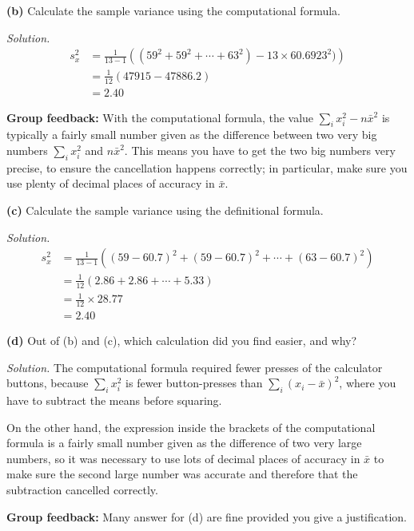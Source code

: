\documentclass[
  a4paper,
]{book}
\theoremstyle{definition}
\theoremstyle{definition}
\theoremstyle{definition}
\theoremstyle{definition}
\theoremstyle{remark}
\begin{document}
\textbf{(b)} Calculate the sample variance using the computational formula.

\begin{myanswers}
\emph{Solution.}
\begin{align*}
s_x^2 &= \frac{1}{13 - 1} \left( (59^2 + 59^2 + \cdots + 63^2) - 13 \times 60.6923^2)\right) \\
      &= \frac{1}{12} (47915 - 47886.2) \\
      &= 2.40
\end{align*}

\textbf{Group feedback:} With the computational formula, the value \(\sum_i x_i^2 - n \bar{x}^2\) is typically a fairly small number given as the difference between two very big numbers \(\sum_i x_i^2\) and \(n \bar x^2\). This means you have to get the two big numbers very precise, to ensure the cancellation happens correctly; in particular, make sure you use plenty of decimal places of accuracy in \(\bar x\).

\end{myanswers}

\textbf{(c)} Calculate the sample variance using the definitional
formula.

\begin{myanswers}
\emph{Solution.}
\begin{align*}
s_x^2 &= \frac{1}{13 - 1} \left( (59 - 60.7)^2 + (59 - 60.7)^2 + \cdots + (63 - 60.7)^2 \right) \\
      &= \frac{1}{12} (2.86 + 2.86 + \cdots + 5.33) \\
      &= \frac{1}{12} \times 28.77 \\
      &= 2.40
\end{align*}

\end{myanswers}

\textbf{(d)} Out of (b) and (c), which calculation did you find easier, and why?

\begin{myanswers}
\emph{Solution.} The computational formula required fewer presses of the calculator buttons, because \(\sum_i x_i^2\) is fewer button-presses than \(\sum_i (x_i - \bar x)^2\), where you have to subtract the means before squaring.

On the other hand, the expression inside the brackets of the computational formula is a fairly small number given as the difference of two very large numbers, so it was necessary to use lots of decimal places of accuracy in \(\bar x\) to make sure the second large number was accurate and therefore that the subtraction cancelled correctly.

\textbf{Group feedback:} Many answer for (d) are fine provided you give a justification.

\end{myanswers}
\end{document}
